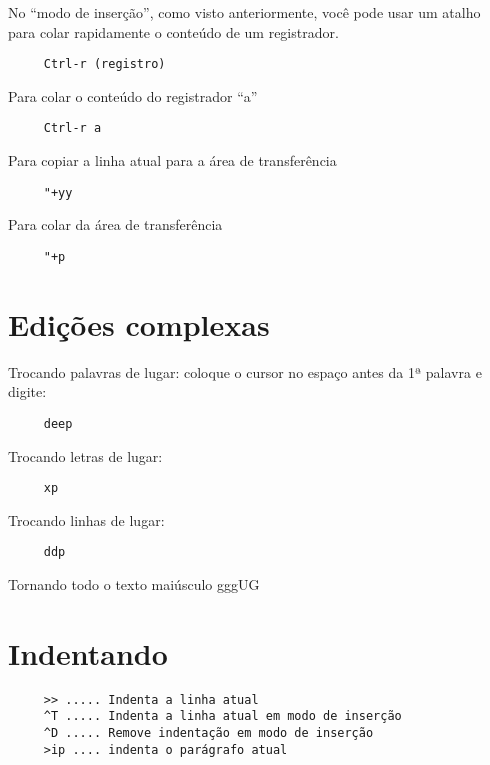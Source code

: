 No ``modo de inserção'', como visto anteriormente, você pode usar um atalho
para colar rapidamente o conteúdo de um registrador.

\begin{verbatim}
     Ctrl-r (registro)
\end{verbatim}

Para colar o conteúdo do registrador ``a''

\begin{verbatim}
     Ctrl-r a
\end{verbatim}

Para copiar a linha atual para a área de transferência

\begin{verbatim}
     "+yy
\end{verbatim}

Para colar da área de transferência

\begin{verbatim}
     "+p
\end{verbatim}

\section{Edições complexas }
\label{Edições complexas }

Trocando palavras de lugar: coloque o cursor no espaço antes da 1ª palavra e digite:

\begin{verbatim}
     deep
\end{verbatim}

Trocando letras de lugar:

\begin{verbatim}
     xp
\end{verbatim}

Trocando linhas de lugar:

\begin{verbatim}
     ddp
\end{verbatim}

Tornando todo o texto maiúsculo
 gggUG

\section{Indentando }

\begin{verbatim}
     >> ..... Indenta a linha atual
     ^T ..... Indenta a linha atual em modo de inserção
     ^D ..... Remove indentação em modo de inserção
     >ip .... indenta o parágrafo atual
\end{verbatim}

